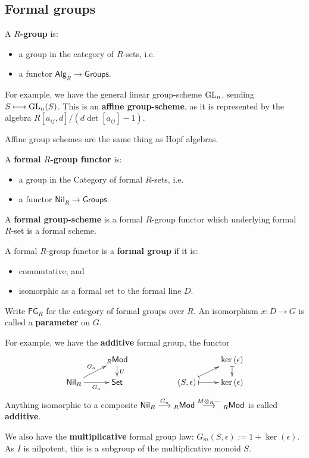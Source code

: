 \documentclass[11pt]{article}
\newcommand{\RAlg}{\mathsf{Alg}_R}
\newcommand{\RNil}{\mathsf{Nil}_R}
\newcommand{\FGR}{\mathsf{FG}_R}
\begin{document}
\subsection{Formal groups}
\begin{itemise}
\setlength{\parindent}{.25in}
\item A \textbf{$R$-group} is:
\begin{itemize}\squishlist
\setlength{\parindent}{.25in}
\item  a group in the category of $R$-sets, i.e.
\item a functor $\RAlg\to\mathsf{Groups}$.
\end{itemize}
For example, we have the general linear group-scheme $\mbox{GL}_n$, sending $S\longmapsto \mbox{GL}_n(S)$. This is an \textbf{affine group-scheme}, as it is represented by the algebra $R[a_{ij},d]/(d\det[a_{ij}]-1)$.

Affine group schemes are the same thing as Hopf algebras.
\item A \textbf{formal $R$-group functor} is:
\begin{itemize}\squishlist
\setlength{\parindent}{.25in}
\item  a group in the Category of formal $R$-sets, i.e.
\item a functor $\RNil\to\mathsf{Groups}$.
\end{itemize}
\item A \textbf{formal group-scheme} is a formal $R$-group functor which underlying formal $R$-set is a formal scheme.
\item A formal $R$-group functor is a \textbf{formal group} if it is:
\begin{itemize}\squishlist
\setlength{\parindent}{.25in}
\item commutative; and
\item isomorphic as a formal set to the formal line $D$.
\end{itemize}
Write $\FGR$ for the category of formal groups over $R$.
An isomorphism $x:D\to G$ is called a \textbf{parameter} on $G$.
\item For example, we have the \textbf{additive} formal group, the functor
\[\xymatrix@R=4mm{
&%
{{_R}\mathsf{Mod}}
\ar[d]^-{U}
&%
&%
&%
\ker(\epsilon)\ar@{|->}[d]
\\%
\ar[ur]^-{{G}_a}
\RNil
\ar[r]_-{{G}_a}
&%
\Set
&%
&%
(S,\epsilon)
\ar@{|->}[r]
\ar@{|->}[ur]
&%
\ker(\epsilon)%
}\]
Anything isomorphic to a composite $\RNil\overset{{G}_a}{\to}{{_R}\mathsf{Mod}}\overset{{M}\otimes_{R}{\DASH }}{\to}{{_R}\mathsf{Mod}}$ is called \textbf{additive}.

We also have the \textbf{multiplicative} formal group law: ${G}_m(S,\epsilon):=1+\ker(\epsilon)$. As $I$ is nilpotent, this is a subgroup of the multiplicative monoid $S$.
\end{itemise}
\end{document}
